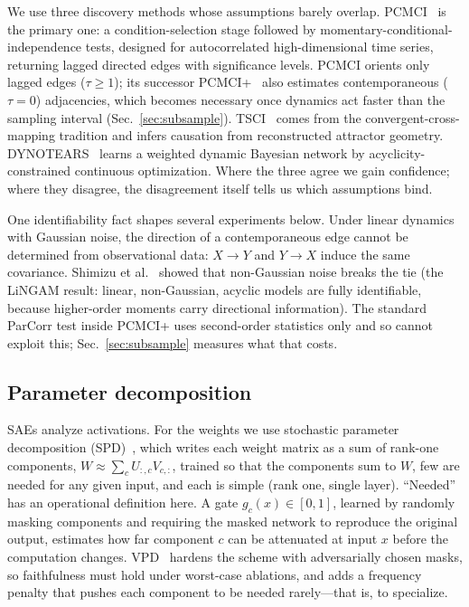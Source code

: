 We use three discovery methods whose assumptions barely overlap.
PCMCI~\cite{runge2019} is the primary one: a condition-selection stage followed by
momentary-conditional-independence tests, designed for autocorrelated
high-dimensional time series, returning lagged directed edges with significance
levels. PCMCI orients only lagged edges ($\tau \ge 1$); its successor
PCMCI+~\cite{runge2020} also estimates contemporaneous ($\tau = 0$) adjacencies,
which becomes necessary once dynamics act faster than the sampling interval
(Sec.~\ref{sec:subsample}). TSCI~\cite{tsci} comes from the
convergent-cross-mapping tradition and infers causation from reconstructed
attractor geometry. DYNOTEARS~\cite{dynotears} learns a weighted dynamic Bayesian
network by acyclicity-constrained continuous optimization. 
Where the three agree we gain confidence; where they disagree, the disagreement
itself tells us which assumptions bind.

One identifiability fact shapes several experiments below. Under linear dynamics
with Gaussian noise, the direction of a contemporaneous edge cannot be determined
from observational data: $X \to Y$ and $Y \to X$ induce the same covariance.
Shimizu et al.~\cite{shimizu2006} showed that non-Gaussian noise breaks the tie
(the LiNGAM result: linear, non-Gaussian, acyclic models are fully identifiable,
because higher-order moments carry directional information). The standard ParCorr
test inside PCMCI+ uses second-order statistics only and so cannot exploit this;
Sec.~\ref{sec:subsample} measures what that costs.

\subsection{Parameter decomposition}
\label{sec:pd-background}

SAEs analyze activations. For the weights we use stochastic parameter
decomposition (SPD)~\cite{spd}, which writes each weight matrix as a sum of
rank-one components, $W \approx \sum_c U_{:,c} V_{c,:}$, trained so that the
components sum to $W$, few are needed for any given input, and each is simple
(rank one, single layer). ``Needed'' has an operational definition here. A gate
$g_c(x) \in [0,1]$, learned by randomly masking components and requiring the
masked network to reproduce the original output, estimates how far component $c$
can be attenuated at input $x$ before the computation changes. VPD~\cite{vpd}
hardens the scheme with adversarially chosen masks, so faithfulness must hold
under worst-case ablations, and adds a frequency penalty that pushes each
component to be needed rarely---that is, to specialize.

